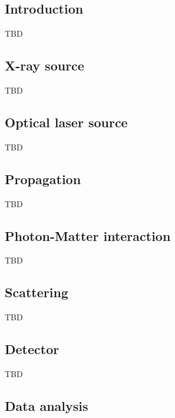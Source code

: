 \documentclass[a4paper]{article}
\begin{document}
\subsection{Introduction}
TBD
\subsection{X-ray source}
TBD
\subsection{Optical laser source}
TBD
\subsection{Propagation}
TBD
\subsection{Photon-Matter interaction}
TBD
\subsection{Scattering}
TBD
\subsection{Detector}
TBD
\subsection{Data analysis}
\end{document}
